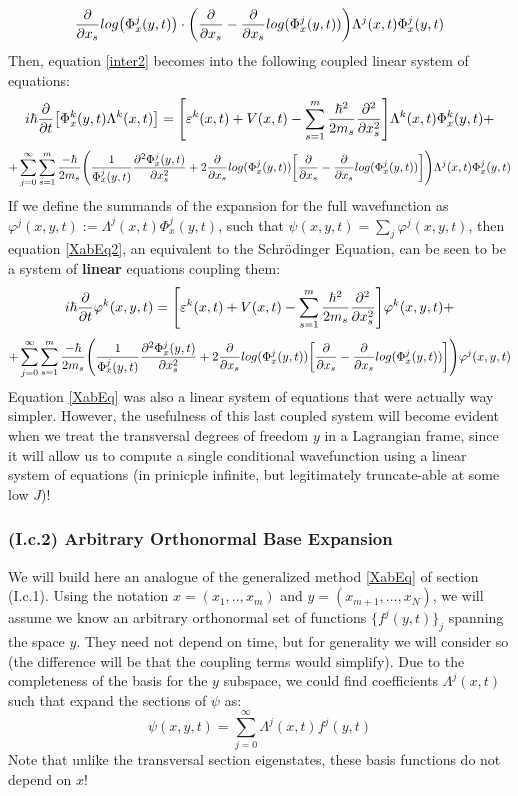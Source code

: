 \documentclass[11pt, a4paper]{article} %
\begin{document}
$$
\pdv{}{x_s}log\qty(\Phi^j_x(y,t))\cdot \qty(\pdv{}{x_s}-\pdv{}{x_s}log(\Phi^j_x(y,t)) )\Lambda^j(x,t)\Phi^j_x(y,t)
$$
Then, equation \eqref{inter2} becomes into the following coupled linear system of equations:
\begin{equation}\label{XabEq2}
 i\hbar\pdv{}{t}\qty[ \Phi^k_x(y,t)\Lambda^k(x,t)]=\qty[ \varepsilon^k(x,t)+V(x,t)  -\sum_{s=1}^m\frac{\hbar^2}{2m_s}\pdv[2]{}{x_s} ]\Lambda^k(x,t)\Phi^k_x(y,t)+
\end{equation}
$$
+\sum_{j=0}^\infty\sum_{s=1}^m \frac{-\hbar}{2m_s}\qty( \frac{1}{\Phi^j_x(y,t)}\pdv[2]{\Phi^j_x(y,t)}{x_s}+2\pdv{}{x_s}log(\Phi^j_x(y,t))\qty[\pdv{}{x_s}-\pdv{}{x_s}log(\Phi^j_x(y,t))] )\Lambda^j(x,t)\Phi^j_x(y,t)
$$
If we define the summands of the expansion for the full wavefunction as $\varphi^j(x,y,t):=\Lambda^j(x,t)\Phi^j_x(y,t)$, such that $\psi(x,y,t)=\sum_j \varphi^j(x,y,t)$, then equation \eqref{XabEq2}, an equivalent to the Schrödinger Equation, can be seen to be a system of {\bf linear} equations coupling them:
\begin{equation}\label{XabEq2.5}
 i\hbar\pdv{}{t}\varphi^k(x,y,t)=\qty[ \varepsilon^k(x,t)+V(x,t)  -\sum_{s=1}^m\frac{\hbar^2}{2m_s}\pdv[2]{}{x_s} ]\varphi^k(x,y,t)+
\end{equation}
$$
+\sum_{j=0}^\infty\sum_{s=1}^m \frac{-\hbar}{2m_s}\qty( \frac{1}{\Phi^j_x(y,t)}\pdv[2]{\Phi^j_x(y,t)}{x_s}+2\pdv{}{x_s}log(\Phi^j_x(y,t))\qty[\pdv{}{x_s}-\pdv{}{x_s}log(\Phi^j_x(y,t))] )\varphi^j(x,y,t)
$$
Equation \eqref{XabEq} was also a linear system of equations that were actually way simpler. However, the usefulness of this last coupled system will become evident when we treat the transversal degrees of freedom $y$ in a Lagrangian frame, since it will allow us to compute a single conditional wavefunction using a linear system of equations (in prinicple infinite, but legitimately truncate-able at some low $J$)!\vspace{-0.3cm}

\subsubsection*{(I.c.2) Arbitrary Orthonormal Base Expansion}
We will build here an analogue of the generalized method \eqref{XabEq} of section (I.c.1). Using the notation $x=(x_1,..,x_m)$ and $y=(x_{m+1},...,x_N)$, we will assume we know an arbitrary orthonormal set of functions $\{ f^j(y,t) \}_j$ spanning the space $y$. They need not depend on time, but for generality we will consider so (the difference will be that the coupling terms would simplify). Due to the completeness of the basis for the $y$ subspace, we could find coefficients $\Lambda^j(x,t)$ such that expand the sections of $\psi$ as:\vspace{-0.3cm}
\begin{equation}
\psi(x,y,t)=\sum_{j=0}^\infty \Lambda^j(x,t) f^j(y,t)
\end{equation}\vspace{-0.3cm}
Note that unlike the transversal section eigenstates, these basis functions do not depend on $x$!
\end{document}
